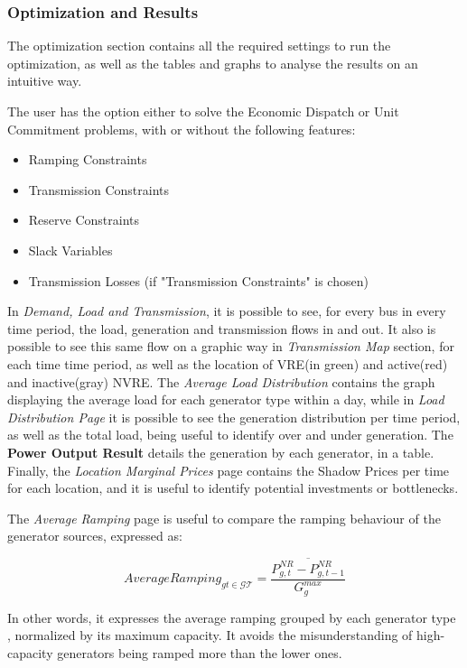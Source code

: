 \documentclass[12pt,LUDisStyle,twosided]{book}
\newcommand{\mc}{\mathcal}
\begin{document}
\subsubsection{Optimization and Results}

The optimization section contains all the required settings to run the optimization, as well as the tables and graphs to analyse the results on an intuitive way. 

The user has the option either to solve the Economic Dispatch or Unit Commitment problems, with or without the following features:

\begin{itemize}
\item Ramping Constraints
\item Transmission Constraints
\item Reserve Constraints
\item Slack Variables
\item Transmission Losses (if "Transmission Constraints" is chosen)
\end{itemize}

In \textit{Demand, Load and Transmission}, it is possible to see, for every bus in every time period, the load, generation and transmission flows in and out. It also is possible to see this same flow on a graphic way in \textit{Transmission Map} section, for each time time period, as well as the location of VRE(in green) and active(red) and inactive(gray) NVRE. The \textit{Average Load Distribution} contains the graph displaying the average load for each generator type within a day, while in \textit{Load Distribution Page} it is possible to see the generation distribution per time period, as well as the total load, being useful to identify over and under generation. The \textbf{Power Output Result} details the generation by each generator, in a table. Finally, the \textit{Location Marginal Prices} page contains the Shadow Prices per time for each location, and it is useful to identify potential investments or bottlenecks.

The \textit{Average Ramping} page is useful to compare the ramping behaviour of the generator sources, expressed as:

\begin{equation}
    AverageRamping_{gt \in \mc{GT}} = \overline{\dfrac{P^{NR}_{g,t} - P^{NR}_{g,t-1}}{G^{max}_{g}}}
\end{equation}

In other words, it expresses the average ramping grouped by each generator type , normalized by its maximum capacity. It avoids the misunderstanding of high-capacity generators being ramped more than the lower ones.
\end{document}
